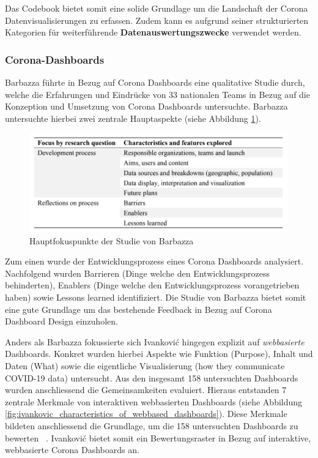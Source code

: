Das Codebook bietet somit eine solide Grundlage um die Landschaft der Corona Datenvisualisierungen zu erfassen. Zudem kann es aufgrund seiner strukturierten Kategorien für weiterführende \textbf{Datenauswertungszwecke} verwendet werden.   
 
 
\subsubsection{Corona-Dashboards}
Barbazza führte in Bezug auf Corona Dashboards eine qualitative Studie durch, welche die Erfahrungen und Eindrücke von 33 nationalen Teams in Bezug auf die Konzeption und Umsetzung von Corona Dashboards untersuchte. Barbazza untersuchte hierbei zwei zentrale Hauptaspekte (siehe Abbildung \ref{fig:barbazza_method_design}). 


\begin{figure}[h]
    \includegraphics[width=12cm]{images/barbazza_method_design.png}
    \centering
    \caption{Hauptfokuspunkte der Studie von Barbazza ~\citep[S. 4]{barbazza}}
    \label{fig:barbazza_method_design}
\end{figure}

Zum einen wurde der Entwicklungsprozess eines Corona Dashboards analysiert. Nachfolgend wurden Barrieren (Dinge welche den Entwicklungsprozess behinderten), Enablers (Dinge welche den Entwicklungsprozess vorangetrieben haben) sowie Lessons learned identifiziert. Die Studie von Barbazza bietet somit eine gute Grundlage um das bestehende Feedback in Bezug auf Corona Dashboard Design einzuholen.

Anders als Barbazza fokussierte sich Ivankovi{\'c} hingegen explizit auf \textit{webbasierte} Dashboards. Konkret wurden hierbei Aspekte wie Funktion (Purpose), Inhalt und Daten (What) sowie die eigentliche Visualisierung (how they communicate COVID-19 data) untersucht. Aus den insgesamt 158 untersuchten Dashboards wurden anschliessend die Gemeinsamkeiten evaluiert. Hieraus entstanden 7 zentrale Merkmale von interaktiven webbasierten Dashboards (siehe Abbildung \ref{fig:ivankovic_characteristics_of_webbased_dashboards}). Diese Merkmale bildeten anschliessend die Grundlage, um die 158 untersuchten Dashboards zu bewerten ~\citep{ivankovic}. Ivankovi{\'c} bietet somit ein Bewertungsraster in Bezug auf interaktive, webbasierte Corona Dashboards an.


